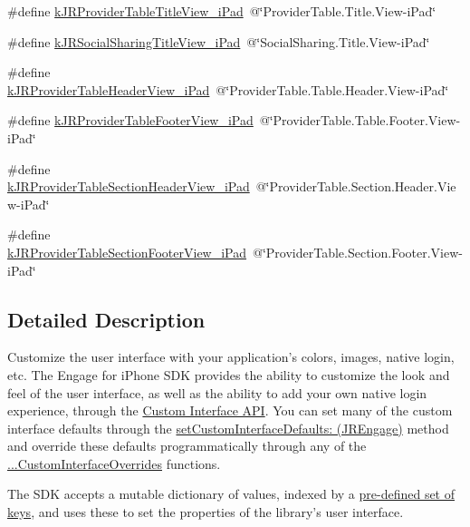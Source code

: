 \begin{DoxyCompactItemize}
\item 
\#define \hyperlink{group__custom_interface_ga52c322e9fd2aa78cbd64d050f0fd5e41}{kJRProviderTableTitleView\_\-iPad}~@\char`\"{}ProviderTable.Title.View-\/iPad\char`\"{}
\item 
\#define \hyperlink{group__custom_interface_ga2f88062cdd1fd38ad0e800d382450398}{kJRSocialSharingTitleView\_\-iPad}~@\char`\"{}SocialSharing.Title.View-\/iPad\char`\"{}
\item 
\#define \hyperlink{group__custom_interface_gafaf90a1aa537b105ebc2409ceacc652f}{kJRProviderTableHeaderView\_\-iPad}~@\char`\"{}ProviderTable.Table.Header.View-\/iPad\char`\"{}
\item 
\#define \hyperlink{group__custom_interface_gaa23a63165d46433e2ec24ba44ef771da}{kJRProviderTableFooterView\_\-iPad}~@\char`\"{}ProviderTable.Table.Footer.View-\/iPad\char`\"{}
\item 
\#define \hyperlink{group__custom_interface_ga7dcb3488390fabe1f3a358fb5af1e42c}{kJRProviderTableSectionHeaderView\_\-iPad}~@\char`\"{}ProviderTable.Section.Header.View-\/iPad\char`\"{}
\item 
\#define \hyperlink{group__custom_interface_gaa2196cc44d4e0dc4de9e98248c8a7e10}{kJRProviderTableSectionFooterView\_\-iPad}~@\char`\"{}ProviderTable.Section.Footer.View-\/iPad\char`\"{}
\end{DoxyCompactItemize}


\subsection{Detailed Description}
Customize the user interface with your application's colors, images, native login, etc. The Engage for iPhone SDK provides the ability to customize the look and feel of the user interface, as well as the ability to add your own native login experience, through the \hyperlink{interface_j_r_engage_07_custom_interface_08_customInterface}{Custom Interface API}. You can set many of the custom interface defaults through the \hyperlink{class_j_r_engage_ab62496ba7cbc32e0a4f7d91c992c7ca2}{setCustomInterfaceDefaults: (JREngage)} method and override these defaults programmatically through any of the \hyperlink{class_j_r_engage_showMethods}{...CustomInterfaceOverrides} functions.

The SDK accepts a mutable dictionary of values, indexed by a \hyperlink{group__custom_interface_customInterfaceKeys}{pre-\/defined set of keys}, and uses these to set the properties of the library's user interface.

